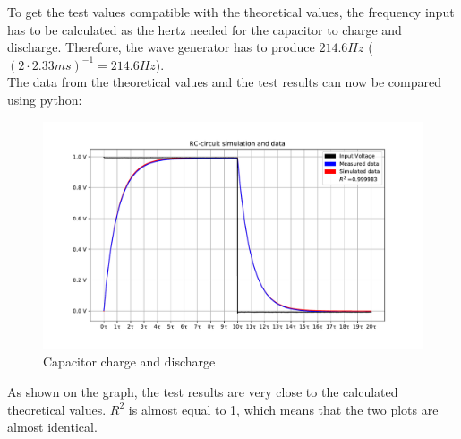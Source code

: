 To get the test values compatible with the theoretical values, the frequency input has to be calculated as the hertz needed for the capacitor to charge and discharge. Therefore, the wave generator has to produce $214.6 Hz$  ($(2 \cdot 2.33 ms)^{-1} = 214.6 Hz$). \\
The data from the theoretical values and the test results can now be compared using python:
\begin{figure}[H]
\center
\includegraphics[scale=0.6]{fig/img/eks_1}
\caption{Capacitor charge and discharge}
\end{figure}
\noindent As shown on the graph, the test results are very close to the calculated theoretical values. $R^2$ is almost equal to 1, which means that the two plots are almost identical.
